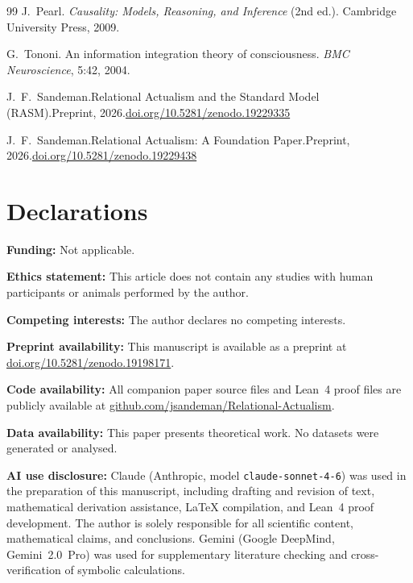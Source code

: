 \documentclass[11pt,a4paper]{article}
\theoremstyle{remark}
\begin{document}
\begin{thebibliography}{99}
J.~Pearl.
\newblock \textit{Causality: Models, Reasoning, and Inference} (2nd ed.).
\newblock Cambridge University Press, 2009.

G.~Tononi.
\newblock An information integration theory of consciousness.
\newblock \textit{BMC Neuroscience}, 5:42, 2004.

J.~F.~Sandeman.\newblock Relational Actualism and the Standard Model ({RASM}).\newblock Preprint, 2026.\newblock \href{https://doi.org/10.5281/zenodo.19229335}{doi.org/10.5281/zenodo.19229335}

J.~F.~Sandeman.\newblock Relational Actualism: A Foundation Paper.\newblock Preprint, 2026.\newblock \href{https://doi.org/10.5281/zenodo.19229438}{doi.org/10.5281/zenodo.19229438}

\end{thebibliography}

\section*{Declarations}
\textbf{Funding:} Not applicable.

\textbf{Ethics statement:} This article does not contain any studies with human participants or animals performed by the author.

\quad
\textbf{Competing interests:} The author declares no competing interests.

\textbf{Preprint availability:} This manuscript is available as a preprint at
\href{https://doi.org/10.5281/zenodo.19198171}{doi.org/10.5281/zenodo.19198171}.

\textbf{Code availability:} All companion paper source files and Lean~4 proof files are publicly available at \href{https://github.com/jsandeman/Relational-Actualism}{github.com/jsandeman/Relational-Actualism}.

\textbf{Data availability:} This paper presents theoretical work. No datasets
were generated or analysed.

\textbf{AI use disclosure:} Claude (Anthropic, model \texttt{claude-sonnet-4-6}) was used in the preparation of this manuscript, including drafting and revision of text, mathematical derivation assistance, \LaTeX{} compilation, and Lean~4 proof development. The author is solely responsible for all scientific content, mathematical claims, and conclusions. Gemini (Google DeepMind, Gemini~2.0~Pro) was used for supplementary literature checking and cross-verification of symbolic calculations.
\end{document}

